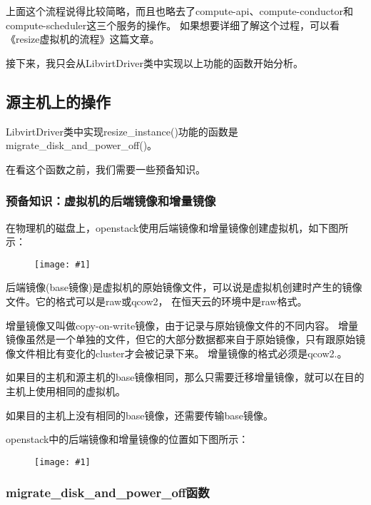 \documentclass[a4paper,left=1.5cm,right=1.5cm,11pt]{article}
\newcommand{\fic}[1]{\begin{figure}[H]
		\center
		\texttt{[image: \#1]}
	\end{figure}}
\begin{document}
	上面这个流程说得比较简略，而且也略去了compute-api、compute-conductor和compute-scheduler这三个服务的操作。
	如果想要详细了解这个过程，可以看《resize虚拟机的流程》这篇文章。\par

	接下来，我只会从LibvirtDriver类中实现以上功能的函数开始分析。

\subsection{源主机上的操作}
	LibvirtDriver类中实现resize\_instance()功能的函数是migrate\_disk\_and\_power\_off()。\par

	在看这个函数之前，我们需要一些预备知识。

\subsubsection{预备知识：虚拟机的后端镜像和增量镜像}
	在物理机的磁盘上，openstack使用后端镜像和增量镜像创建虚拟机，如下图所示：
	\fic{4.png}

	后端镜像(base镜像)是虚拟机的原始镜像文件，可以说是虚拟机创建时产生的镜像文件。它的格式可以是raw或qcow2，
	在恒天云的环境中是raw格式。\par

	增量镜像又叫做copy-on-write镜像，由于记录与原始镜像文件的不同内容。
	增量镜像虽然是一个单独的文件，但它的大部分数据都来自于原始镜像，只有跟原始镜像文件相比有变化的cluster才会被记录下来。
	增量镜像的格式必须是qcow2.。\par

	如果目的主机和源主机的base镜像相同，那么只需要迁移增量镜像，就可以在目的主机上使用相同的虚拟机。\par

	如果目的主机上没有相同的base镜像，还需要传输base镜像。\par

	openstack中的后端镜像和增量镜像的位置如下图所示：
	\fic{5.png}

\subsubsection{migrate\_disk\_and\_power\_off函数}
\end{document}
